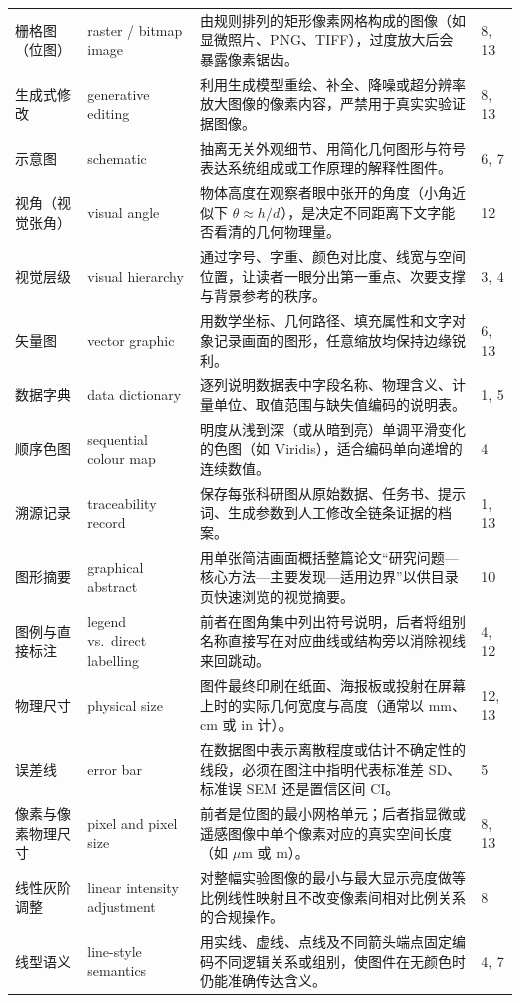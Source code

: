 \begin{longtable}{@{}p{26mm}p{32mm}p{54mm}p{8mm}@{}}
栅格图（位图） & raster / bitmap image & 由规则排列的矩形像素网格构成的图像（如显微照片、PNG、TIFF），过度放大后会暴露像素锯齿。 & 8, 13 \\
生成式修改 & generative editing & 利用生成模型重绘、补全、降噪或超分辨率放大图像的像素内容，严禁用于真实实验证据图像。 & 8, 13 \\
示意图 & schematic & 抽离无关外观细节、用简化几何图形与符号表达系统组成或工作原理的解释性图件。 & 6, 7 \\
视角（视觉张角） & visual angle & 物体高度在观察者眼中张开的角度（小角近似下 $\theta \approx h/d$），是决定不同距离下文字能否看清的几何物理量。 & 12 \\
视觉层级 & visual hierarchy & 通过字号、字重、颜色对比度、线宽与空间位置，让读者一眼分出第一重点、次要支撑与背景参考的秩序。 & 3, 4 \\
矢量图 & vector graphic & 用数学坐标、几何路径、填充属性和文字对象记录画面的图形，任意缩放均保持边缘锐利。 & 6, 13 \\
数据字典 & data dictionary & 逐列说明数据表中字段名称、物理含义、计量单位、取值范围与缺失值编码的说明表。 & 1, 5 \\
顺序色图 & sequential colour map & 明度从浅到深（或从暗到亮）单调平滑变化的色图（如 Viridis），适合编码单向递增的连续数值。 & 4 \\
溯源记录 & traceability record & 保存每张科研图从原始数据、任务书、提示词、生成参数到人工修改全链条证据的档案。 & 1, 13 \\
图形摘要 & graphical abstract & 用单张简洁画面概括整篇论文“研究问题—核心方法—主要发现—适用边界”以供目录页快速浏览的视觉摘要。 & 10 \\
图例与直接标注 & legend vs.\ direct labelling & 前者在图角集中列出符号说明，后者将组别名称直接写在对应曲线或结构旁以消除视线来回跳动。 & 4, 12 \\
物理尺寸 & physical size & 图件最终印刷在纸面、海报板或投射在屏幕上时的实际几何宽度与高度（通常以 mm、cm 或 in 计）。 & 12, 13 \\
误差线 & error bar & 在数据图中表示离散程度或估计不确定性的线段，必须在图注中指明代表标准差 SD、标准误 SEM 还是置信区间 CI。 & 5 \\
像素与像素物理尺寸 & pixel and pixel size & 前者是位图的最小网格单元；后者指显微或遥感图像中单个像素对应的真实空间长度（如 $\mu$m 或 m）。 & 8, 13 \\
线性灰阶调整 & linear intensity adjustment & 对整幅实验图像的最小与最大显示亮度做等比例线性映射且不改变像素间相对比例关系的合规操作。 & 8 \\
线型语义 & line-style semantics & 用实线、虚线、点线及不同箭头端点固定编码不同逻辑关系或组别，使图件在无颜色时仍能准确传达含义。 & 4, 7 \\

\end{longtable}
